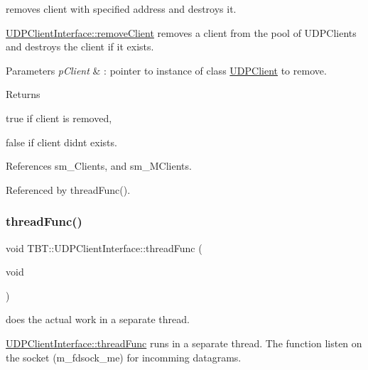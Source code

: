removes client with specified address and destroys it. 

\hyperlink{classTBT_1_1UDPClientInterface_a1a80ed1e5670443bc35691c9f3d5ff72_a1a80ed1e5670443bc35691c9f3d5ff72}{U\+D\+P\+Client\+Interface\+::remove\+Client} removes a client from the pool of U\+D\+P\+Clients and destroys the client if it exists.


\begin{DoxyParams}{Parameters}
{\em p\+Client} & \+: pointer to instance of class \hyperlink{classTBT_1_1UDPClient}{U\+D\+P\+Client} to remove.\\
\hline
\end{DoxyParams}
\begin{DoxyReturn}{Returns}

\begin{DoxyItemize}
\item true if client is removed,
\item false if client didn\textquotesingle{}t exists. 
\end{DoxyItemize}
\end{DoxyReturn}


References sm\+\_\+\+Clients, and sm\+\_\+\+M\+Clients.



Referenced by thread\+Func().

\mbox{\label{classTBT_1_1UDPClientInterface_abce6a58e1d8fbb71f9b08e4d5b3871c2_abce6a58e1d8fbb71f9b08e4d5b3871c2}} 
\subsubsection{\texorpdfstring{thread\+Func()}{threadFunc()}}
{\footnotesize\ttfamily void T\+B\+T\+::\+U\+D\+P\+Client\+Interface\+::thread\+Func (\begin{DoxyParamCaption}\item[{void}]{ }\end{DoxyParamCaption})\hspace{0.3cm}{\ttfamily [private]}}



does the actual work in a separate thread. 

\hyperlink{classTBT_1_1UDPClientInterface_abce6a58e1d8fbb71f9b08e4d5b3871c2_abce6a58e1d8fbb71f9b08e4d5b3871c2}{U\+D\+P\+Client\+Interface\+::thread\+Func} runs in a separate thread. The function listen on the socket (m\+\_\+fdsock\+\_\+me) for incomming datagrams. 

